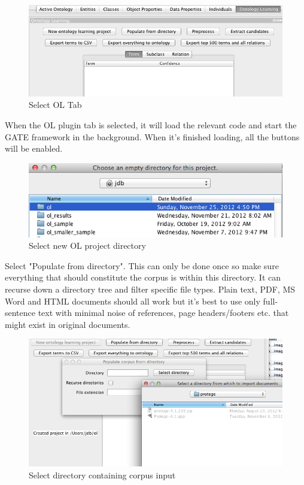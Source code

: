 \documentclass[a4paper]{report}
\begin{document}
\begin{figure}[H]
  \centering
  \includegraphics[width=.8\textwidth]{graphics/3._Select_OL_Tab.png}
  \caption{Select OL Tab}
  \label{fig:walkthrough3}
\end{figure}
When the OL plugin tab is selected, it will load the relevant code and start the GATE framework in the background.
When it's finished loading, all the buttons will be enabled. 

\begin{figure}[H]
  \centering
  \includegraphics[width=.6\textwidth]{graphics/4._Select_new_OL_project_directory.png}
  \caption{Select new OL project directory}
  \label{fig:walkthrough4}
\end{figure}
Select "Populate from directory".
This can only be done once so make sure everything that should constitute the corpus is within this directory.
It can recurse down a directory tree and filter specific file types.
Plain text, PDF, MS Word and HTML documents should all work but it's best to use only full-sentence text with minimal noise of references, page headers/footers etc. that might exist in original documents. 

\begin{figure}[H]
  \centering
  \includegraphics[width=.8\textwidth]{graphics/5._Select_directory_containing_corpus_input.png}
  \caption{Select directory containing corpus input}
  \label{fig:walkthrough5}
\end{figure}
\end{document}
